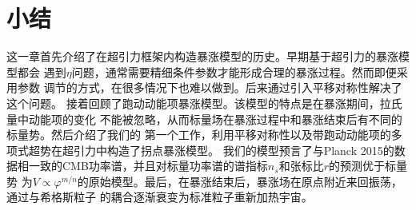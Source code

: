 \section{小结}

这一章首先介绍了在超引力框架内构造暴涨模型的历史。早期基于超引力的暴涨模型都会
遇到$\eta$问题，通常需要精细条件参数才能形成合理的暴涨过程。然而即便采用参数
调节的方式，在很多情况下也难以做到。后来通过引入平移对称性解决了这个问题。
接着回顾了跑动动能项暴涨模型。该模型的特点是在暴涨期间，拉氏量中动能项的变化
不能被忽略，从而标量场在暴涨过程中和暴涨结束后有不同的标量势。然后介绍了我们的
第一个工作，利用平移对称性以及带跑动动能项的多项式超势在超引力中构造了拐点暴涨模型。
我们的模型预言了与Planck
2015的数据相一致的CMB功率谱，并且对标量功率谱的谱指标$n_{s}$和张标比$r$的预测优于标量势
为$V\propto \varphi^{m
/n}$的原始模型。最后，在暴涨结束后，暴涨场在原点附近来回振荡，通过与希格斯粒子
的耦合逐渐衰变为标准粒子重新加热宇宙。
